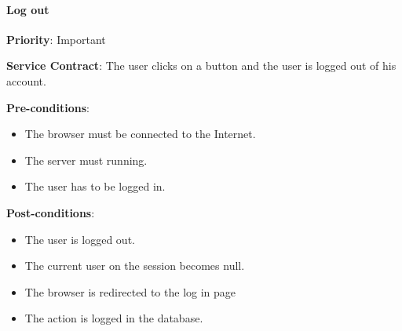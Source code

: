     	\paragraph{Log out}
			\begin{description}
			    \item{\textbf{Priority}:} Important
			    \item{\textbf{Service Contract}:} The user clicks on a button and the user is logged out of his account. 
			    \item{\textbf{Pre-conditions}:}
    			    \begin{itemize}
    			        \item The browser must be connected to the Internet.
    			        \item The server must running. 	
    			        \item The user has to be logged in. 
    			    \end{itemize}
			    \item{\textbf{Post-conditions}:} 
    			    \begin{itemize}
    			      \item The user is logged out.
    			      \item The current user on the session becomes null.
    			      \item The browser is redirected to the log in page 
    			      \item  The action is logged in the database.
    			    \end{itemize}
			\end{description}
			

